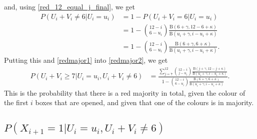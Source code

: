 and, using \eqref{red_12_equal_j_final}, we get 
\begin{equation}
\label{u12neq6}
    \begin{aligned}
        P(U_i+V_i\neq6|U_i=u_i) 
        &= 1-P(U_i+V_i=6|U_i=u_i)\\[6pt]
        &= 1-\binom{12-i}{6-u_i} \frac{\text{B}(6+\gamma,12-6+\kappa)}{\text{B}(u_i+\gamma,i-u_i+\kappa)}\\[6pt]
        &= 1-\binom{12-i}{6-u_i} \frac{\text{B}(6+\gamma,6+\kappa)}{\text{B}(u_i+\gamma,i-u_i+\kappa)}.
    \end{aligned}
\end{equation}
Putting this and \eqref{redmajor1} into \eqref{redmajor2}, we get
\begin{equation*}
\label{redmajor_final}
    \begin{aligned}
        P(U_i+V_i \geq 7 | U_i=u_i,U_i+V_i \neq 6) 
        &= \frac{\sum_{j=7}^{12} \binom{12-i}{j-u_i} \frac{\text{B}(j+\gamma,12-j+\kappa)}{\text{B}(u_i+\gamma,i-u_i+\kappa)}}{1-\binom{12-i}{6-u_i} \frac{\text{B}(6+\gamma,6+\kappa)}{\text{B}(u_i+\gamma,i-u_i+\kappa)}}.
    \end{aligned}
\end{equation*}
This is the probability that there is a red majority in total, given the colour of the first $i$ boxes that are opened, and given that one of the colours is in majority. 



\subsection{$P(X_{i+1}=1|U_i=u_i,U_i+V_i\neq6)$}

